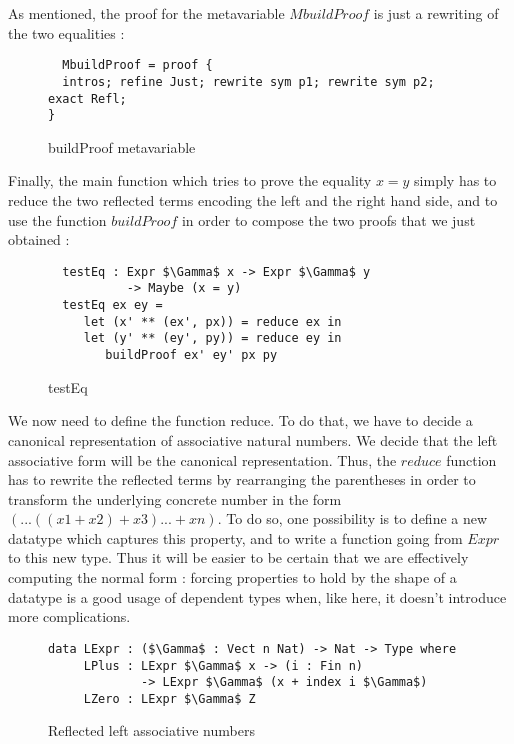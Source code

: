 As mentioned, the proof for the metavariable $MbuildProof$ is just a rewriting of the two equalities :

\begin{figure}[H]
\figrule
\begin{center}
\begin{lstlisting}
  MbuildProof = proof {
  intros; refine Just; rewrite sym p1; rewrite sym p2; exact Refl;
}  
\end{lstlisting}
\end{center}
\caption{buildProof metavariable}
\figrule
\end{figure}

Finally, the main function which tries to prove the equality $x=y$ simply has to reduce the two reflected terms encoding the left and the right hand side, and to use the function $buildProof$ in order to compose the two proofs that we just obtained :

\begin{figure}[H]
\figrule
\begin{center}
\begin{lstlisting}
  testEq : Expr $\Gamma$ x -> Expr $\Gamma$ y 
           -> Maybe (x = y)
  testEq ex ey = 
     let (x' ** (ex', px)) = reduce ex in 
     let (y' ** (ey', py)) = reduce ey in
        buildProof ex' ey' px py 
\end{lstlisting}
\end{center}
\caption{testEq}
\figrule
\end{figure}

We now need to define the function reduce. To do that, we have to decide a canonical representation of associative natural numbers. We decide that the left associative form will be the canonical representation. Thus, the $reduce$ function has to rewrite the reflected terms by rearranging the parentheses in order to transform the underlying concrete number in the form $(...((x1 + x2) + x3) ... + xn)$. To do so, one possibility is to define a new datatype which captures this property, and to write a function going from $Expr$ to this new type. Thus it will be easier to be certain that we are effectively computing the normal form : forcing properties to hold by the shape of a datatype is a good usage of dependent types when, like here, it doesn't introduce more complications.

\begin{figure}[H]
\figrule
\begin{center}
\begin{lstlisting}
data LExpr : ($\Gamma$ : Vect n Nat) -> Nat -> Type where
     LPlus : LExpr $\Gamma$ x -> (i : Fin n) 
             -> LExpr $\Gamma$ (x + index i $\Gamma$)
     LZero : LExpr $\Gamma$ Z
\end{lstlisting}
\end{center}
\caption{Reflected left associative numbers}
\figrule
\end{figure}

